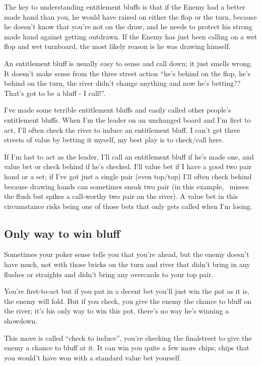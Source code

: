 The key to understanding entitlement bluffs is that if the Enemy had a
better made hand than you, he would have raised on either the flop or
the turn, because he doesn't know that you're not on the draw, and he
needs to protect his strong made hand against getting outdrawn. If the
Enemy has just been calling on a wet flop and wet turnboard, the most
likely reason is he was drawing himself.

An entitlement bluff is usually easy to sense and call down; it
just smells wrong. It doesn't make sense from the three street action
``he's behind on the flop, he's behind on the turn, the river
didn't change anything and now he's betting?? That's got to be
a bluff - I call!''.

I've made some terrible entitlement bluffs and easily called
other people's entitlement bluffs. When I'm the leader on
an unchanged board and I'm first to act, I'll often check the
river to induce an entitlement bluff. I can't get three streets
of value by betting it myself, my best play is to check/call here.

If I'm last to act as the leader, I'll call an entitlement bluff
if he's made one, and value bet or check behind if he's checked.
I'll value bet if I have a good two pair hand or a set; if I've
got just a single pair (even top/top) I'll often check behind
because drawing hands can sometimes sneak two pair (in this example,
\sixd\fived\ misses the flush but spikes a call-worthy two pair
on the river). A value bet in this circumstance risks being one
of those bets that only gets called when I'm losing.

\subsection{Only way to win bluff}

Sometimes your poker sense tells you that you're ahead, but the enemy
doesn't have much, not with those bricks on the turn and river that
didn't bring in any flushes or straights and didn't bring any
overcards to your top pair.

You're first-to-act but if you put in a decent bet you'll just win the
pot as it is, the enemy will fold. But if you check, you give the
enemy the chance to bluff on the river; it's his only way to win this
pot, there's no way he's winning a showdown.

This move is called ``check to induce'', you're checking the
finalstreet to give the enemy a chance to bluff at it. It can win you
quite a few more chips; chips that you would't have won with a
standard value bet yourself.

